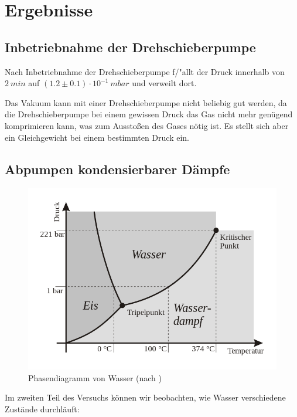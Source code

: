 \documentclass[12pt, a4paper]{scrartcl}
\begin{document}
	\section{Ergebnisse}
	\subsection{Inbetriebnahme der Drehschieberpumpe}
	
		Nach Inbetriebnahme der Drehschieberpumpe f/"allt der Druck innerhalb von
        $2\ min$
        auf 
        $(1.2\pm0.1)\cdot 10^{-1}\ mbar$
        und verweilt dort.
		
		Das Vakuum kann mit einer Drehschieberpumpe nicht beliebig gut werden, da die Drehschieberpumpe bei einem gewissen Druck das Gas nicht mehr genügend komprimieren kann, was zum Ausstoßen des Gases nötig ist.
		Es stellt sich aber ein Gleichgewicht bei einem bestimmten Druck ein.
        		
	\subsection{Abpumpen kondensierbarer Dämpfe}
		
		\begin{figure}[H]
			\centering
			\includegraphics[width=.5\paperwidth]{phasen-wasser}
			\caption{Phasendiagramm von Wasser (nach \cite{wikibooks})}
		\end{figure}
    
        Im zweiten Teil des Versuchs k\"onnen wir beobachten, wie Wasser verschiedene Zustände durchläuft:
        
\end{document}
